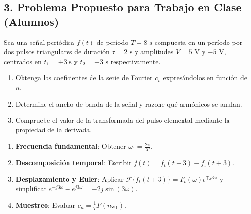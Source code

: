 \newpage
\subsection*{3. Problema Propuesto para Trabajo en Clase (Alumnos)}

\begin{problema}
Sea una señal periódica $f(t)$ de período $T = 8\text{ s}$ compuesta en un período por dos pulsos triangulares de duración $\tau = 2\text{ s}$ y amplitudes $V = 5\text{ V}$ y $-5\text{ V}$, centrados en $t_1 = +3\text{ s}$ y $t_2 = -3\text{ s}$ respectivamente.

\begin{enumerate}[label=\alph*)]
    \item Obtenga los coeficientes de la serie de Fourier $c_n$ expresándolos en función de $n$.
    \item Determine el ancho de banda de la señal y razone qué armónicos se anulan.
    \item Compruebe el valor de la transformada del pulso elemental mediante la propiedad de la derivada.
\end{enumerate}
\end{problema}

\begin{mecanizado}
\begin{enumerate}
    \item \textbf{Frecuencia fundamental}: Obtener $\omega_1 = \frac{2\pi}{T}$.
    \item \textbf{Descomposición temporal}: Escribir $f(t) = f_t(t - 3) - f_t(t + 3)$.
    \item \textbf{Desplazamiento y Euler}: Aplicar $\mathcal{F}\{f_t(t \mp 3)\} = F_t(\omega)e^{\mp j 3\omega}$ y simplificar $e^{-j3\omega} - e^{j3\omega} = -2j\sin(3\omega)$.
    \item \textbf{Muestreo}: Evaluar $c_n = \frac{1}{T} F(n\omega_1)$.
\end{enumerate}
\end{mecanizado}

